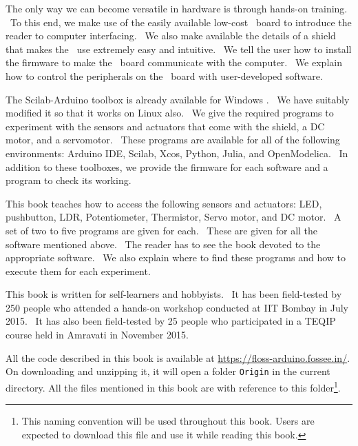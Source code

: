 The only way we can become versatile in hardware is through hands-on
training.  To this end, we make use of the easily available low-cost
\arduino\ board to introduce the reader to computer interfacing.  We
also make available the details of a shield that makes the
\arduino\ use extremely easy and intuitive.  We tell the user how to
install the firmware to make the \arduino\ board communicate with the
computer.  We explain how to control the peripherals on the
\arduino\ board with user-developed software.

The Scilab-Arduino toolbox is already available for Windows
\cite{scilab-arduino}.  We have suitably modified it so that it works
on Linux also.  We give the required programs to experiment with the
sensors and actuators that come with the shield, a DC motor, and a
servomotor.  These programs are available for all of the following
environments: Arduino IDE, Scilab, Xcos, Python, Julia, and
OpenModelica.  In addition to these toolboxes, we provide the firmware
for each software and a program to check its working.

This book teaches how to access the following sensors and actuators:
LED, pushbutton, LDR, Potentiometer, Thermistor, Servo motor, and DC motor.  A set of two to five programs are given for each.  These are given for all the
software mentioned above.  The reader has to see the book devoted to
the appropriate software.  We also explain where to find these
programs and how to execute them for each experiment.

This book is written for self-learners and hobbyists.  It has been
field-tested by 250 people who attended a hands-on workshop conducted
at IIT Bombay in July 2015.  It has also been field-tested by 25
people who participated in a TEQIP course held in Amravati in November
2015.

All the code described in this book is available at
\url{https://floss-arduino.fossee.in/}.  On
downloading and unzipping it, it will open a folder {\tt Origin} in
the current directory.  All the files mentioned in this book are
with reference to this folder\footnote{\label{fn:file-loc}This naming
  convention will be used throughout this book.  Users are expected to
  download this file and use it while reading this book.}.
